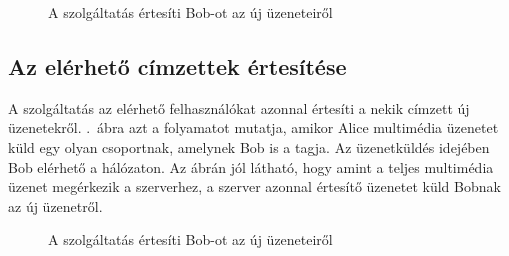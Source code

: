 \begin{figure}[htb]
\center
{}
\caption{A szolgáltatás értesíti Bob-ot az új üzeneteiről}
\label{fig:teszt-vtf-ertesites-01}
\end{figure}

\subsection{Az elérhető címzettek értesítése}
\label{sec:teszteles_notify}

A szolgáltatás az elérhető felhasználókat azonnal értesíti a nekik címzett új üzenetekről. .~ábra azt a folyamatot mutatja, amikor Alice multimédia üzenetet küld egy olyan csoportnak, amelynek Bob is a tagja. Az üzenetküldés idejében Bob elérhető a hálózaton. Az ábrán jól látható, hogy amint a teljes multimédia üzenet megérkezik a szerverhez, a szerver azonnal értesítő üzenetet küld Bobnak az új üzenetről.
\begin{figure}[htb]
\center
{}
\caption{A szolgáltatás értesíti Bob-ot az új üzeneteiről}
\label{fig:teszt-vtf-ertesites-02}
\end{figure}

